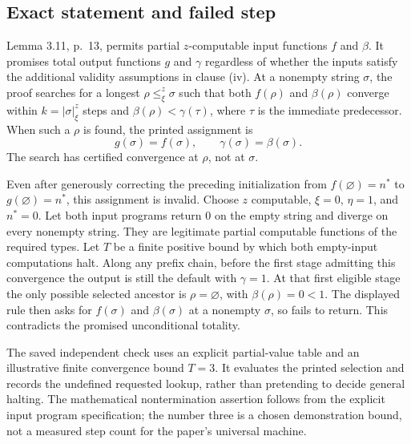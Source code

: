 \documentclass[10pt]{article}
\begin{document}
\subsection*{Exact statement and failed step}
Lemma 3.11, p. 13, permits partial \(z\)-computable input functions \(f\) and \(\beta\). It promises total output functions \(g\) and \(\gamma\) regardless of whether the inputs satisfy the additional validity assumptions in clause (iv). At a nonempty string \(\sigma\), the proof searches for a longest \(\rho\leq_\xi^z\sigma\) such that both \(f(\rho)\) and \(\beta(\rho)\) converge within \(k=|\sigma|_\xi^z\) steps and \(\beta(\rho)<\gamma(\tau)\), where \(\tau\) is the immediate predecessor. When such a \(\rho\) is found, the printed assignment is \[g(\sigma)=f(\sigma),\qquad \gamma(\sigma)=\beta(\sigma).\] The search has certified convergence at \(\rho\), not at \(\sigma\).\par
Even after generously correcting the preceding initialization from \(f(\varnothing)=n^*\) to \(g(\varnothing)=n^*\), this assignment is invalid. Choose \(z\) computable, \(\xi=0\), \(\eta=1\), and \(n^*=0\). Let both input programs return \(0\) on the empty string and diverge on every nonempty string. They are legitimate partial computable functions of the required types. Let \(T\) be a finite positive bound by which both empty-input computations halt. Along any prefix chain, before the first stage admitting this convergence the output is still the default with \(\gamma=1\). At that first eligible stage the only possible selected ancestor is \(\rho=\varnothing\), with \(\beta(\rho)=0<1\). The displayed rule then asks for \(f(\sigma)\) and \(\beta(\sigma)\) at a nonempty \(\sigma\), so fails to return. This contradicts the promised unconditional totality.\par
The saved independent check uses an explicit partial-value table and an illustrative finite convergence bound \(T=3\). It evaluates the printed selection and records the undefined requested lookup, rather than pretending to decide general halting. The mathematical nontermination assertion follows from the explicit input program specification; the number three is a chosen demonstration bound, not a measured step count for the paper’s universal machine.\par
\end{document}
